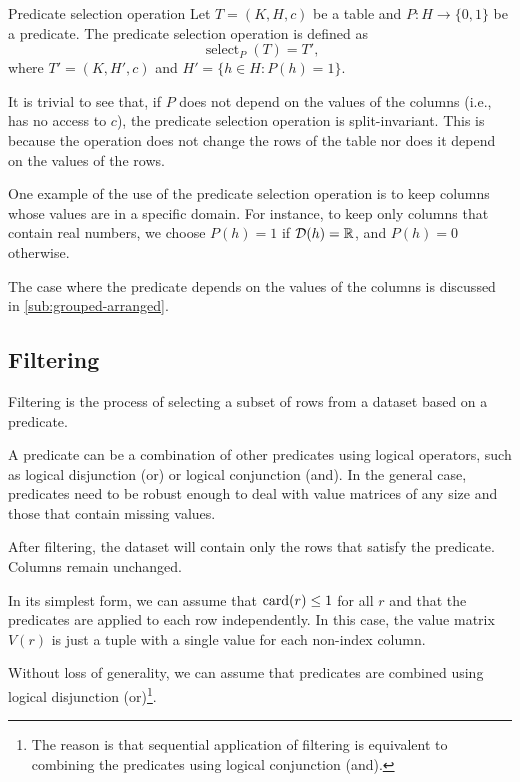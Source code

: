\begin{definition}{Predicate selection operation}\label{def:predicate-selection}
  Let $T = (K, H, c)$ be a table and $P : H \to \{0, 1\}$ be a predicate.  The predicate
  selection operation is defined as \[
    \operatorname{select}_{P}(T) = T'\text{,}
  \] where $T' = (K, H', c)$ and $H' = \{h \in H : P(h) = 1\}$.
\end{definition}

It is trivial to see that, if $P$ does not depend on the values of the columns (i.e., has no
access to $c$), the predicate selection operation is split-invariant.  This is because the
operation does not change the rows of the table nor does it depend on the values of the rows.

One example of the use of the predicate selection operation is to keep columns whose
values are in a specific domain.  For instance, to keep only columns that contain real
numbers, we choose $P(h) = 1$ if $\domainof{h} = \mathbb{R}$, and $P(h) = 0$ otherwise.

The case where the predicate depends on the values of the columns is discussed in
\cref{sub:grouped-arranged}.

\subsection{Filtering}
\label{sub:filtering}

Filtering is the process of selecting a subset of rows from a dataset based on a
predicate.

A predicate can be a combination of other predicates using logical operators, such as
logical disjunction (or) or logical conjunction (and).  In the general case, predicates
need to be robust enough to deal with value matrices of any size and those that contain missing
values.

After filtering, the dataset will contain only the rows that satisfy the predicate.
Columns remain unchanged.

In its simplest form, we can assume that $\rowcard[r] \leq 1$ for all $r$ and that the
predicates are applied to each row independently.  In this case, the value matrix $V(r)$
is just a tuple with a single value for each non-index column.

Without loss of generality, we can assume that predicates are combined using logical
disjunction (or)\footnote{The reason is that sequential application of filtering is
equivalent to combining the predicates using logical conjunction (and).}.

